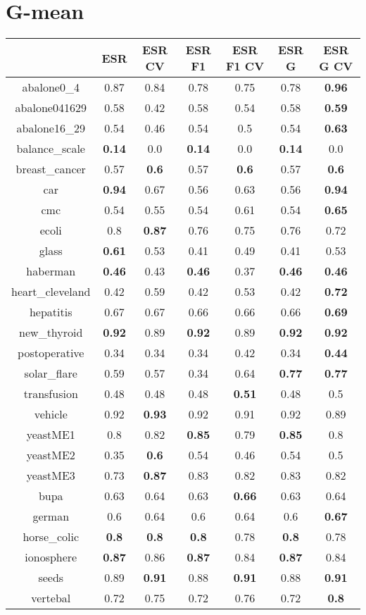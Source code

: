 \documentclass{article}%
\begin{document}
%
\section*{G{-}mean}%
\begin{tabular}{c|cccccc}%
\hline%
&ESR&ESR CV&ESR F1&ESR F1 CV&ESR G&ESR G CV\\%
\hline%
abalone0\_4&0.87&0.84&0.78&0.75&0.78&\textbf{0.96}\\%
\hline%
abalone041629&0.58&0.42&0.58&0.54&0.58&\textbf{0.59}\\%
\hline%
abalone16\_29&0.54&0.46&0.54&0.5&0.54&\textbf{0.63}\\%
\hline%
balance\_scale&\textbf{0.14}&0.0&\textbf{0.14}&0.0&\textbf{0.14}&0.0\\%
\hline%
breast\_cancer&0.57&\textbf{0.6}&0.57&\textbf{0.6}&0.57&\textbf{0.6}\\%
\hline%
car&\textbf{0.94}&0.67&0.56&0.63&0.56&\textbf{0.94}\\%
\hline%
cmc&0.54&0.55&0.54&0.61&0.54&\textbf{0.65}\\%
\hline%
ecoli&0.8&\textbf{0.87}&0.76&0.75&0.76&0.72\\%
\hline%
glass&\textbf{0.61}&0.53&0.41&0.49&0.41&0.53\\%
\hline%
haberman&\textbf{0.46}&0.43&\textbf{0.46}&0.37&\textbf{0.46}&\textbf{0.46}\\%
\hline%
heart\_cleveland&0.42&0.59&0.42&0.53&0.42&\textbf{0.72}\\%
\hline%
hepatitis&0.67&0.67&0.66&0.66&0.66&\textbf{0.69}\\%
\hline%
new\_thyroid&\textbf{0.92}&0.89&\textbf{0.92}&0.89&\textbf{0.92}&\textbf{0.92}\\%
\hline%
postoperative&0.34&0.34&0.34&0.42&0.34&\textbf{0.44}\\%
\hline%
solar\_flare&0.59&0.57&0.34&0.64&\textbf{0.77}&\textbf{0.77}\\%
\hline%
transfusion&0.48&0.48&0.48&\textbf{0.51}&0.48&0.5\\%
\hline%
vehicle&0.92&\textbf{0.93}&0.92&0.91&0.92&0.89\\%
\hline%
yeastME1&0.8&0.82&\textbf{0.85}&0.79&\textbf{0.85}&0.8\\%
\hline%
yeastME2&0.35&\textbf{0.6}&0.54&0.46&0.54&0.5\\%
\hline%
yeastME3&0.73&\textbf{0.87}&0.83&0.82&0.83&0.82\\%
\hline%
bupa&0.63&0.64&0.63&\textbf{0.66}&0.63&0.64\\%
\hline%
german&0.6&0.64&0.6&0.64&0.6&\textbf{0.67}\\%
\hline%
horse\_colic&\textbf{0.8}&\textbf{0.8}&\textbf{0.8}&0.78&\textbf{0.8}&0.78\\%
\hline%
ionosphere&\textbf{0.87}&0.86&\textbf{0.87}&0.84&\textbf{0.87}&0.84\\%
\hline%
seeds&0.89&\textbf{0.91}&0.88&\textbf{0.91}&0.88&\textbf{0.91}\\%
\hline%
vertebal&0.72&0.75&0.72&0.76&0.72&\textbf{0.8}\\%
\hline%
\end{tabular}

%
\end{document}
